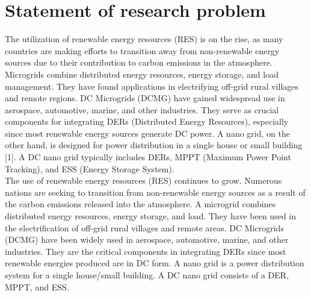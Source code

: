 \section{Statement of research problem}
The utilization of renewable energy resources (RES) is on the rise, as many countries are making efforts to transition away from non-renewable energy sources due to their contribution to carbon emissions in the atmosphere. Microgrids combine distributed energy resources, energy storage, and load management. They have found applications in electrifying off-grid rural villages and remote regions. DC Microgrids (DCMG) have gained widespread use in aerospace, automotive, marine, and other industries. They serve as crucial components for integrating DERs (Distributed Energy Resources), especially since most renewable energy sources generate DC power. A nano grid, on the other hand, is designed for power distribution in a single house or small building [1]. A DC nano grid typically includes DERs, MPPT (Maximum Power Point Tracking), and ESS (Energy Storage System).\\
The use of renewable energy resources (RES) continues to grow. Numerous nations are seeking to transition from non-renewable energy sources as a result of the carbon emissions released into the atmosphere. A microgrid combines distributed energy resources, energy storage, and load. They have been used in the electrification of off-grid rural villages and remote areas. DC Microgrids (DCMG) have been widely used in aerospace, automotive, marine, and other industries. They are the critical components in integrating DERs since most renewable energies produced are in DC form. A nano grid is a power distribution system for a single house/small building. A DC nano grid consists of a DER, MPPT, and ESS.